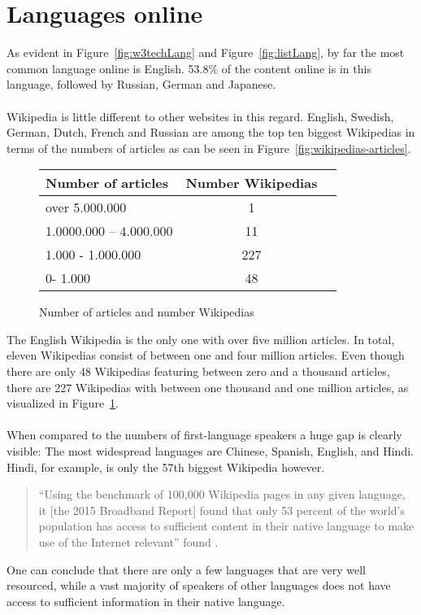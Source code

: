 \section{Languages online}

As evident in Figure~\ref{fig:w3techLang} and Figure~\ref{fig:listLang}, by far the most common language online is English. 53.8\% of the content online is in this language, followed by Russian, German and Japanese. \citep{w3techLang} \\
\\
Wikipedia is little different to other websites in this regard. English, Swedish, German, Dutch, French and Russian are among the top ten biggest Wikipedias in terms of the numbers of articles as can be seen in Figure~\ref{fig:wikipedias-articles}. \\
\begin{figure}[H]
\begin{center}
	\begin{tabular}{| l | c | r |}
		\hline			
		Number of articles & Number Wikipedias \\ \hline
		over 5.000.000 & 1 \\
		1.0000.000 -- 4.000.000 & 11 \\
		1.000 - 1.000.000 & 227 \\
		0- 1.000 & 48 \\
		\hline  
	\end{tabular}
	\end{center}
	\caption{Number of articles and number Wikipedias}
	\label{fig:tableNumWP}
\end{figure}
The English Wikipedia is the only one with over five million articles. In total, eleven Wikipedias consist of between one and four million articles. Even though there are only 48 Wikipedias featuring between zero and a thousand articles, there are 227 Wikipedias with between one thousand and one million articles, as visualized in Figure~\ref{fig:tableNumWP}. \citep{wiki:30} \\
\\
When compared to the numbers of first-language speakers a huge gap is clearly visible: The most widespread languages are Chinese, Spanish, English, and Hindi. Hindi, for example, is only the 57th biggest Wikipedia however.
\begin{quote}
``Using the benchmark of 100,000 Wikipedia pages in any given language, it [the 2015 Broadband Report] found that only 53 percent of the world's population has access to sufficient content in their native language to make use of the Internet relevant'' found \citet{atlanticLang}.
\end{quote}
One can conclude that there are only a few languages that are very well resourced, while a vast majority of speakers of other languages does not have access to sufficient information in their native language.